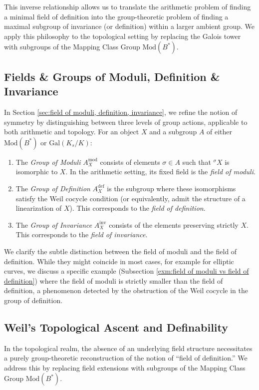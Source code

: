 \documentclass[10pt]{amsart}
\theoremstyle{definition}
\newcommand{\Gal}{{ \mathrm{Gal}}}
\begin{document}
This inverse relationship allows us to translate the arithmetic problem of finding a minimal field of definition into the group-theoretic problem of finding a maximal subgroup of invariance (or definition) within a larger ambient group. We apply this philosophy to the topological setting by replacing the Galois tower with subgroups of the Mapping Class Group $\mathrm{Mod}(B^*)$.

\subsection*{Fields \& Groups of Moduli, Definition \& Invariance}
In Section \ref{sec:field of moduli, definition, invariance}, we refine the notion of symmetry by distinguishing between three levels of group actions, applicable to both arithmetic and topology. For an object $X$ and a subgroup $A$ of either $\mathrm{Mod}(B^*)$ or $\Gal(K_s / K)$:
\begin{enumerate}
    \item The \textit{Group of Moduli} $A_X^{\mathrm{mod}}$ consists of elements $\sigma \in A$ such that ${^\sigma \! X}$ is isomorphic to $X$. In the arithmetic setting, its fixed field is the \textit{field of moduli}.
    \item The \textit{Group of Definition} $A_X^{\mathrm{def}}$ is the subgroup where these isomorphisms satisfy the Weil cocycle condition (or equivalently, admit the structure of a linearization of $X$). This corresponds to the \textit{field of definition}.
    \item The \textit{Group of Invariance} $A_X^{\mathrm{inv}}$ consists of the elements preserving strictly $X$. This corresponds to the {\em field of invariance}.
\end{enumerate}
We clarify the subtle distinction between the field of moduli and the field of definition. While they might coincide in most cases, for example for elliptic curves, we discuss a specific example (Subsection \ref{exm:field of moduli vs field of definition}) where the field of moduli is strictly smaller than the field of definition, a phenomenon detected by the obstruction of the Weil cocycle in the group of definition. 

\subsection*{Weil's Topological Ascent and Definability}
In the topological realm, the absence of an underlying field structure necessitates a purely group-theoretic reconstruction of the notion of ``field of definition.'' We address this by replacing field extensions with subgroups of the Mapping Class Group $\mathrm{Mod}(B^*)$.
\end{document}
